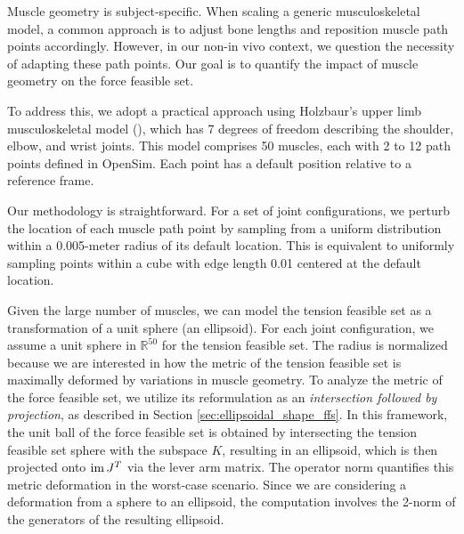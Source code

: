 Muscle geometry is subject-specific. When scaling a generic musculoskeletal model, a common approach is to adjust bone lengths and reposition muscle path points accordingly. However, in our non-in vivo context, we question the necessity of adapting these path points.  Our goal is to quantify the impact of muscle geometry on the force feasible set.

To address this, we adopt a practical approach using Holzbaur's upper limb musculoskeletal model (\cite{holzbaurModelUpperExtremity2005}), which has 7 degrees of freedom describing the shoulder, elbow, and wrist joints. This model comprises 50 muscles, each with 2 to 12 path points defined in OpenSim. Each point has a default position relative to a reference frame.

Our methodology is straightforward. For a set of joint configurations, we perturb the location of each muscle path point by sampling from a uniform distribution within a 0.005-meter radius of its default location. This is equivalent to uniformly sampling points within a cube with edge length 0.01 centered at the default location.

Given the large number of muscles, we can model the tension feasible set as a transformation of a unit sphere (an ellipsoid). For each joint configuration, we assume a unit sphere in $\mathbb{R}^{50}$ for the tension feasible set. The radius is normalized because we are interested in how the metric of the tension feasible set is maximally deformed by variations in muscle geometry. To analyze the metric of the force feasible set, we utilize its reformulation as an \emph{intersection followed by projection}, as described in Section \ref{sec:ellipsoidal_shape_ffs}. In this framework, the unit ball of the force feasible set is obtained by intersecting the tension feasible set sphere with the subspace $K$, resulting in an ellipsoid, which is then projected onto $\operatorname{im} J^T$ via the lever arm matrix.  The operator norm quantifies this metric deformation in the worst-case scenario. Since we are considering a deformation from a sphere to an ellipsoid, the computation involves the 2-norm of the generators of the resulting ellipsoid.

